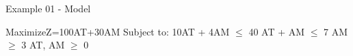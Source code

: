 \begin{frame}{Example 01 - Model}

Maximize\newline Z=100AT+30AM\newline\newline
Subject to:\newline
 10AT + 4AM $\le$  40\newline
  AT + AM $\le$  7 \newline
  AM $\ge$ 3 \newline
  AT, AM $\ge$ 0

\end{frame}
